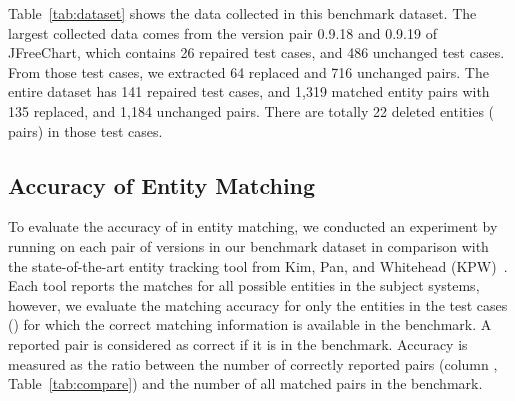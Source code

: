 Table~\ref{tab:dataset} shows the data collected in this benchmark
dataset. The largest collected data comes from the version pair 0.9.18
and 0.9.19 of JFreeChart, which contains 26 repaired test cases,
and 486 unchanged test cases. From those test cases, we extracted 64
replaced and 716 unchanged pairs. The entire dataset has 141
repaired test cases, and 1,319 matched entity pairs with 135 replaced,
and 1,184 unchanged pairs. There are totally 22 deleted entities (
pairs) in those test cases.

\subsection{Accuracy of Entity Matching}
\label{acc}

To evaluate the accuracy of {\tool} in entity matching, we conducted
an experiment by running {\tool} on each pair of versions in our
benchmark dataset in comparison with the state-of-the-art entity tracking
tool from Kim, Pan, and Whitehead
(KPW)~\cite{sungkim-wcre05}. Each tool reports the matches for all
possible entities in the subject systems, however, we evaluate the
matching accuracy for only the entities in the test cases
() for which the correct matching information is available
in the benchmark. A reported pair is considered as correct if it is in
the benchmark. Accuracy is measured as the ratio between the number of
correctly reported pairs (column , Table~\ref{tab:compare}) and
the number of all matched pairs in the benchmark.




